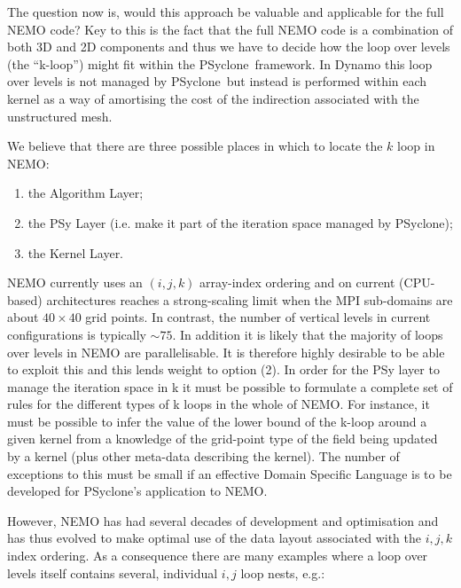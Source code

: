 \documentclass{article}
\newcommand{\psyclone}{{PS}yclone}
\begin{document}
The question now is, would this approach be valuable and applicable
for the full NEMO code?  Key to this is the fact that the full NEMO
code is a combination of both 3D and 2D components and thus we have to
decide how the loop over levels (the ``k-loop'') might fit within the
\psyclone\ framework. In Dynamo this loop over levels is not managed by
\psyclone\ but instead is performed within each kernel as a way of
amortising the cost of the indirection associated with the
unstructured mesh.

We believe that there are three possible places in which to locate the
$k$ loop in NEMO:

\begin{enumerate}

\item the Algorithm Layer;

\item the PSy Layer (i.e. make it part of the iteration space managed
  by \psyclone);

\item the Kernel Layer.

\end{enumerate}

NEMO currently uses an $(i,j,k)$ array-index ordering and on current
(CPU-based) architectures reaches a strong-scaling limit when the MPI
sub-domains are about $40\times 40$ grid points. In contrast, the
number of vertical levels in current configurations is typically
$\sim75$. In addition it is likely that the majority of loops over
levels in NEMO are parallelisable. It is therefore highly desirable to
be able to exploit this and this lends weight to option (2). In order
for the PSy layer to manage the iteration space in k it must be
possible to formulate a complete set of rules for the different types
of k loops in the whole of NEMO. For instance, it must be possible to
infer the value of the lower bound of the k-loop around a given kernel
from a knowledge of the grid-point type of the field being updated by
a kernel (plus other meta-data describing the kernel). The number of
exceptions to this must be small if an effective Domain Specific
Language is to be developed for \psyclone's application to NEMO.

However, NEMO has had several decades of development and optimisation
and has thus evolved to make optimal use of the data layout associated
with the $i,j,k$ index ordering. As a consequence there are many
examples where a loop over levels itself contains several, individual
$i,j$ loop nests, e.g.:
\end{document}
